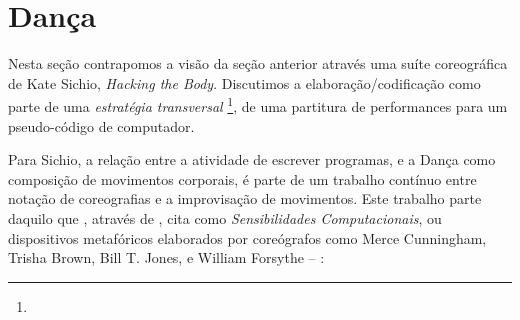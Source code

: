 
\section{Dança}\label{sec:coreografia}

Nesta seção contrapomos a visão da seção anterior através uma suíte coreográfica de Kate Sichio, \emph{Hacking the Body}. Discutimos a elaboração/codificação como parte de uma \emph{estratégia transversal} \footnote{}, de uma partitura de performances para um pseudo-código de computador.

Para Sichio, a relação entre a atividade de escrever programas, e a Dança como composição de movimentos corporais, é parte de um trabalho contínuo entre notação de coreografias e a improvisação de movimentos. Este trabalho parte daquilo que , através de , cita como \emph{Sensibilidades Computacionais}, ou dispositivos metafóricos elaborados por coreógrafos como Merce Cunningham, Trisha Brown, Bill T. Jones, e William Forsythe --  \cite[cap.~1, p.~2--4]{downie_choreography_2005}:

